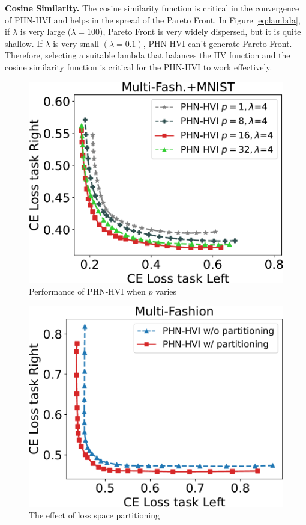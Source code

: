 \documentclass[letterpaper]{article} %
\newcommand{\ourmodel}{PHN-HVI }
\begin{document}
\textbf{Cosine Similarity.} The cosine similarity function is critical in the convergence of \ourmodel and helps in the spread of the Pareto Front. In Figure \ref{eq:lambda}, if $\lambda$ is very large ($\lambda=100$), Pareto Front is very widely dispersed, but it is quite shallow. If $\lambda$ is very small $(\lambda = 0.1)$, \ourmodel can't generate Pareto Front. Therefore, selecting a suitable lambda that balances the HV function and the cosine similarity function is critical for the \ourmodel to work effectively.
\begin{figure}[!htb]
  \centering
  \includegraphics[width=0.75\columnwidth]{figures/Compare_Head_2.pdf}
  \caption{Performance of \ourmodel when $p$ varies}
  \label{fig:head}
\end{figure}
\begin{figure}[!htb]
  \centering
  \includegraphics[width=0.75\columnwidth]{figures/Partition.pdf}
  \caption{The effect of loss space partitioning}
  \label{fig:adap_correct}
\end{figure}
\end{document}
